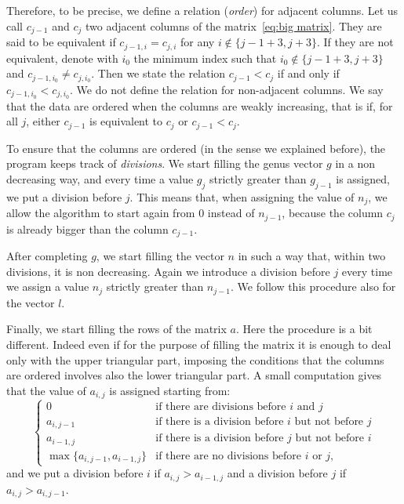 \documentclass{amsart}
\theoremstyle{plain}
\theoremstyle{definition}
\begin{document}
Therefore, to be precise, we define a relation (\emph{order}) for
adjacent columns. Let us call $c_{j-1}$ and $c_j$ two adjacent columns
of the matrix~\eqref{eq:big matrix}. They are said to be equivalent if
$c_{j-1,i} = c_{j,i}$ for any $i \notin \{j-1+3, j+3\}$. If they are
not equivalent, denote with $i_0$ the minimum index such that $i_0
\notin \{ j-1+3, j+3\}$ and $c_{j-1,i_0} \neq c_{j,i_0}$. Then we
state the relation $c_{j-1} < c_j$ if and only if $c_{j-1,i_0} <
c_{j,i_0}$. We do not define the relation for non-adjacent columns.
We say that the data are ordered when the columns are weakly
increasing, that is if, for all $j$, either $c_{j-1}$ is equivalent to
$c_j$ or $c_{j-1} < c_j$.

To ensure that the columns are ordered (in the sense we explained
before), the program keeps track of \emph{divisions}. We start filling
the genus vector $g$ in a non decreasing way, and every time a value
$g_j$ strictly greater than $g_{j-1}$ is assigned, we put a division
before $j$.
This means that, when assigning the value of $n_j$, we allow the
algorithm to start again from $0$ instead of $n_{j-1}$, because the
column $c_j$ is already bigger than the column $c_{j-1}$.

After completing $g$, we start filling the vector $n$ in such a way
that, within two divisions, it is non decreasing. Again we introduce a
division before $j$ every time we assign a value $n_j$ strictly
greater than $n_{j-1}$. We follow this procedure also for the vector
$l$.

Finally, we start filling the rows of the matrix $a$. Here the
procedure is a bit different. Indeed even if for the purpose of
filling the matrix it is enough to deal only with the upper triangular
part, imposing the conditions that the columns are ordered involves
also the lower triangular part. A small computation gives that the
value of $a_{i,j}$ is assigned starting from:
\[
\begin{cases}
  0 & \text{if there are divisions before $i$ and $j$}\\
  a_{i,j-1} & \text{if there is a division before $i$ but not before
    $j$}\\
  a_{i-1,j} & \text{if there is a division before $j$ but not before
    $i$}\\
  \max\{a_{i,j-1}, a_{i-1,j}\} & \text{if there are no divisions
    before $i$ or $j$,}
\end{cases}
\]
and we put a division before $i$ if $a_{i,j} > a_{i-1,j}$ and a
division before $j$ if $a_{i,j} > a_{i,j-1}$.
\end{document}
